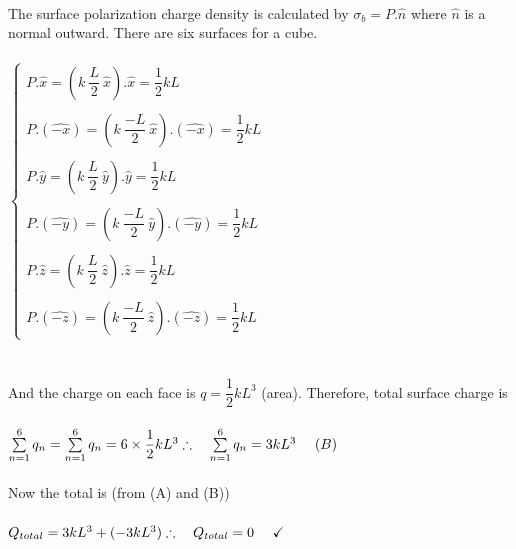 \documentclass[fleqn]{article}
\begin{document}
\begin{enumerate}
{        \\
        The surface polarization charge density is calculated by $\sigma_b=P.\hat{n}$ where $\hat{n}$ is a normal outward. There are six 
        surfaces for a cube.
        \\
        \\
        $
          \begin{cases}
            P.\hat{x}=\left(k ~ \dfrac{L}{2} ~ \hat{x}\right).\hat{x}=\dfrac{1}{2}kL
            \\
            \\
            P.\left(\hat{-x}\right)=\left(k ~ \dfrac{-L}{2} ~ \hat{x}\right).\left(\hat{-x}\right)=\dfrac{1}{2}kL
            \\
            \\
            P.\hat{y}=\left(k ~ \dfrac{L}{2} ~ \hat{y}\right).\hat{y}=\dfrac{1}{2}kL
            \\
            \\
            P.\left(\hat{-y}\right)=\left(k ~ \dfrac{-L}{2} ~ \hat{y}\right).\left(\hat{-y}\right)=\dfrac{1}{2}kL
            \\
            \\
            P.\hat{z}=\left(k ~ \dfrac{L}{2} ~ \hat{z}\right).\hat{z}=\dfrac{1}{2}kL
            \\
            \\
            P.\left(\hat{-z}\right)=\left(k ~ \dfrac{-L}{2} ~ \hat{z}\right).\left(\hat{-z}\right)=\dfrac{1}{2}kL
          \end{cases}
        $
        \\
        \\
        \\
        And the charge on each face is $q=\dfrac{1}{2}kL^3$ (area). Therefore, total surface charge is
        \\
        \\
        $
          \sum\limits_{n=1}^{6} q_n=\sum\limits_{n=1}^{6} q_n=6 \times \dfrac{1}{2}kL^3
          \\
          \\
          \\
          \therefore ~~~ \sum\limits_{n=1}^{6} q_n=3kL^3 ~~~~ (B)
        $
        \\
        \\
        Now the total is (from (A) and (B))
        \\
        \\
        $
          Q_{total}=3kL^3+(-3kL^3)
          \\
          \\
          \\
          \therefore ~~~ Q_{total}=0 ~~~~ \checkmark
        $
        \\
      }
  

\end{enumerate}
\end{document}
